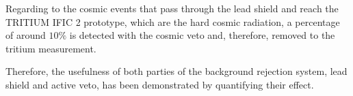 Regarding to the cosmic events that pass through the lead shield and reach the TRITIUM IFIC 2 prototype, which are the hard cosmic radiation, a percentage of around $10\%$ is detected with the cosmic veto and, therefore, removed to the tritium measurement.

Therefore, the usefulness of both parties of the background rejection system, lead shield and active veto, has been demonstrated by quantifying their effect.